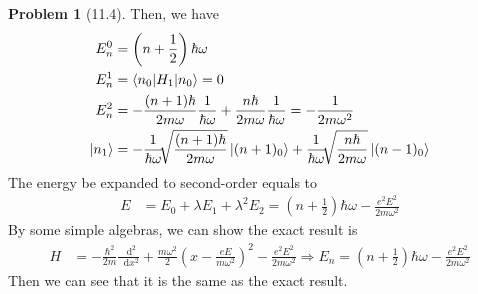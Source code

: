 \documentclass[twoside,11pt]{article}
\renewcommand*\d{\mathop{}\!\mathrm{d}}
\theoremstyle{definition}
\newtheorem{problem}{Problem}
\theoremstyle{remark}
\begin{document}
\begin{problem}[11.4]
Then, we have
\begin{align*}
    E_n^0 &= \left(n+\frac{1}{2}\right)\hbar\omega\\
    E^1_n &= \braket{n_0|H_1|n_0} = 0\\
    E^2_n &= -\frac{(n+1)\hbar}{2m\omega}\frac{1}{\hbar\omega} + \frac{n\hbar}{2m\omega}\frac{1}{\hbar\omega}
    = -\frac{1}{2m\omega^2}\\
    \ket{n_1} &= -\frac{1}{\hbar\omega}\sqrt[]{\frac{(n+1)\hbar}{2m\omega}}\ket{(n+1)_0}
    + \frac{1}{\hbar\omega}\sqrt[]{\frac{n\hbar}{2m\omega}}\ket{(n-1)_0}
\end{align*}
The energy be expanded to second-order equals to 
\begin{align*}
    E &= E_0 + \lambda E_1 + \lambda^2 E_2 
    = \left(n+\frac{1}{2}\right)\hbar\omega - \frac{e^2E^2}{2m\omega^2}
\end{align*}
By some simple algebras, we can show the exact result is
\begin{align*}
    H &= -\frac{\hbar^2}{2m}\frac{\d^2}{\d x^2}
    + \frac{m\omega^2}{2}\left(x-\frac{eE}{m\omega^2}\right)^2
    - \frac{e^2E^2}{2m\omega^2}\Rightarrow
    E_n = \left(n+\frac{1}{2}\right)\hbar\omega - \frac{e^2E^2}{2m\omega^2}
\end{align*}
Then we can see that it is the same as the exact result.
\end{problem}





\end{document}
